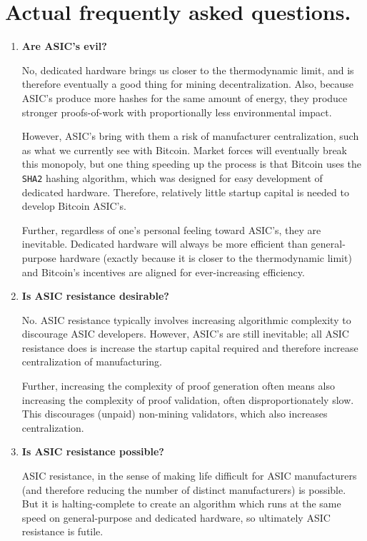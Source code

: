 \documentclass[letterpaper]{article}
\theoremstyle{xxx}
\theoremstyle{evil}
\theoremstyle{yyy}
\theoremstyle{plain}
\theoremstyle{zzz}
\begin{document}
\section{Actual frequently asked questions.}

\begin{enumerate}
\item \textbf{Are ASIC's evil?}

No, dedicated hardware brings us closer to the thermodynamic limit,
and is therefore eventually a good thing for mining decentralization.
Also, because ASIC's produce more hashes for the same amount of
energy, they produce stronger proofs-of-work with proportionally less
environmental impact.

However, ASIC's bring with them a risk of manufacturer centralization,
such as what we currently see with Bitcoin. Market forces will
eventually break this monopoly, but one thing speeding up the process
is that Bitcoin uses the \texttt{SHA2} hashing algorithm, which was
designed for easy development of dedicated hardware. Therefore,
relatively little startup capital is needed to develop Bitcoin ASIC's.

Further, regardless of one's personal feeling toward ASIC's, they
are inevitable. Dedicated hardware will always be more efficient
than general-purpose hardware (exactly because it is closer to the
thermodynamic limit) and Bitcoin's incentives are aligned for
ever-increasing efficiency.

\item \textbf{Is ASIC resistance desirable?}

No. ASIC resistance typically involves increasing algorithmic
complexity to discourage ASIC developers. However, ASIC's are
still inevitable; all ASIC resistance does is increase the
startup capital required and therefore increase centralization
of manufacturing.

Further, increasing the complexity of proof generation often means
also increasing the complexity of proof validation, often
disproportionately slow. This discourages (unpaid) non-mining
validators, which also increases centralization.

\item \textbf{Is ASIC resistance possible?}

ASIC resistance, in the sense of making life difficult for ASIC
manufacturers (and therefore reducing the number of distinct
manufacturers) is possible. But it is halting-complete to create
an algorithm which runs at the same speed on general-purpose and
dedicated hardware, so ultimately ASIC resistance is futile.


\end{enumerate}
\end{document}
